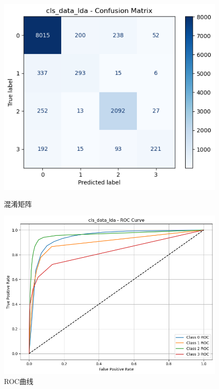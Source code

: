 \documentclass[10pt]{article}
\begin{document}
\begin{figure}[H]
\centering
\begin{minipage}[t]{0.45\textwidth}
  \centering
  \includegraphics[width=\linewidth]{cls_knn_lda1.png}
  \caption{混淆矩阵}
  \label{fig:24}
\end{minipage}
\hfill
\begin{minipage}[t]{0.52\textwidth}
  \centering
  \includegraphics[width=\linewidth]{cls_knn_lda2.png}
  \caption{ROC曲线}
  \label{fig:25}
\end{minipage}
\end{figure}
\end{document}

